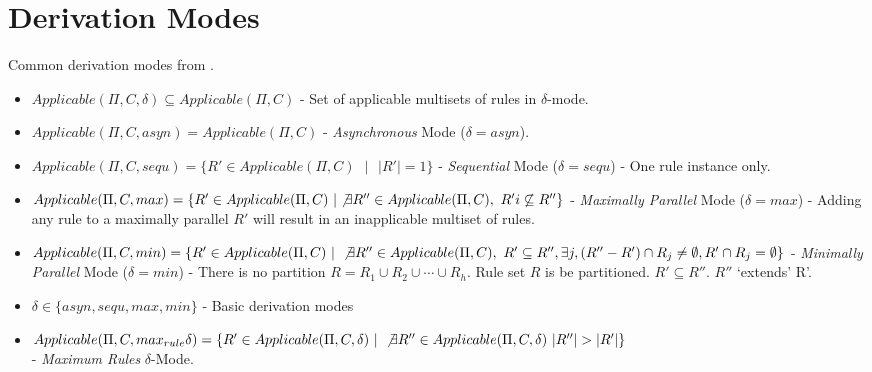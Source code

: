 \documentclass[a4paper]{article}
\theoremstyle{definition}
\newcommand{\ts}{\text{ }}
\begin{document}
\section{Derivation Modes}\label{app-derivation}

Common derivation modes from \cite{freund-2007-ff-1}.

\begin{itemize}                                                                                       
   \item $Applicable(\Pi, C, \delta) \subseteq Applicable(\Pi, C)$ - Set of applicable multisets of 
         rules in $\delta$-mode.                                                                                 
   \item $Applicable(\Pi, C, asyn) = Applicable(\Pi, C)$ - \textit{Asynchronous} Mode ($\delta = 
         asyn$).            
   \item $Applicable(\Pi, C, sequ) = \{R' \in Applicable(\Pi, C) \ts | \ts |R'|=1\}$ - 
         \textit{Sequential} Mode ($\delta = sequ$) - One rule instance only.                                                         
   \item $Applicable(\Pi, C, max) = \{R' \in Applicable(\Pi, C) \ts | \not\exists R'' \in Applicable(\Pi, C), \ts R' i   
         \not\subseteq R'' \}$ - \textit{Maximally Parallel} Mode ($\delta = max$) - Adding any rule 
         to a maximally parallel $R'$ will result in an inapplicable multiset of rules.                 
   \item $Applicable(\Pi, C, min) = \{R' \in Applicable(\Pi, C) \ts | \ts \not\exists R'' \in Applicable(\Pi,C), \ts R'   
         \subseteq R'', \exists j, (R''-R') \cap R_j \neq \emptyset, R' \cap R_j = \emptyset\}$                                                                                              
         - \textit{Minimally Parallel} Mode ($\delta = min$) - There is no partition                    
          $R = R_1 \cup R_2 \cup \cdots \cup R_h$. Rule set $R$ is be partitioned.                      
          $R' \subseteq R''$. $R''$ `extends' R'.                                                       
   \item $\delta \in \{asyn, sequ, max, min\}$ - Basic derivation modes                                 
   \item $Applicable(\Pi, C, max_{rule}\delta) = \{R' \in Applicable(\Pi, C, \delta) \ts | \ts \not\exists R''        
         \in Applicable(\Pi,C, \delta) \ts |R''| > |R'|\}$\\ - \textit{Maximum Rules} $\delta$-Mode.           

\end{itemize}
\end{document}

